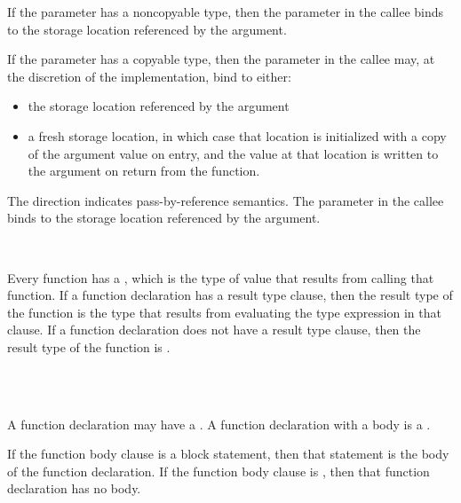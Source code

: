 If the parameter has a noncopyable type, then the parameter in the callee binds to the storage location referenced by the argument.

If the parameter has a copyable type, then the parameter in the callee may, at the discretion of the implementation, bind to either:

\begin{itemize}
\item the storage location referenced by the argument
\item a fresh storage location, in which case that location is initialized with a copy of the argument value on entry, and the value at that location is written to the argument on return from the function.
\end{itemize}


The  direction indicates pass-by-reference semantics.
The parameter in the callee binds to the storage location referenced by the argument.


\begin{Syntax}
     \\
        \code{->} 
\end{Syntax}

Every function has a , which is the type of value that results from calling that function.
If a function declaration has a result type clause, then the result type of the function is the type that results from evaluating the type expression in that clause.
If a function declaration does not have a result type clause, then the result type of the function is .


\begin{Syntax}
     \\
         \\
        \SynOr \code{;}
\end{Syntax}

A function declaration may have a .
A function declaration with a body is a .

If the function body clause is a block statement, then that statement is the body of the function declaration.
If the function body clause is \code{;}, then that function declaration has no body.

